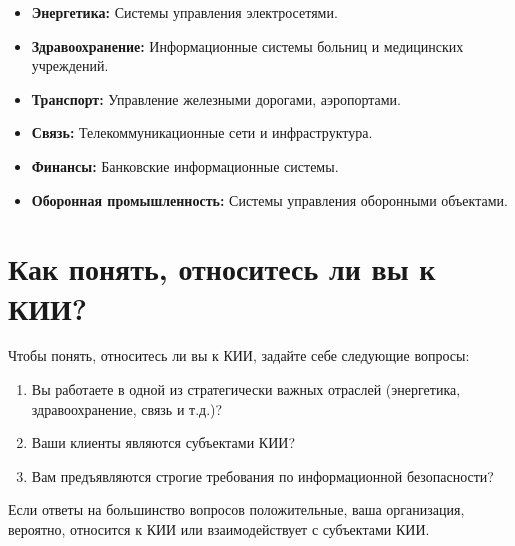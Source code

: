 \documentclass[a4paper, 14pt]{report}
\begin{document}
\begin{itemize}
    \item \textbf{Энергетика:} Системы управления электросетями.
    \item \textbf{Здравоохранение:} Информационные системы больниц и медицинских учреждений.
    \item \textbf{Транспорт:} Управление железными дорогами, аэропортами.
    \item \textbf{Связь:} Телекоммуникационные сети и инфраструктура.
    \item \textbf{Финансы:} Банковские информационные системы.
    \item \textbf{Оборонная промышленность:} Системы управления оборонными объектами.
\end{itemize}

\section{Как понять, относитесь ли вы к КИИ?}
Чтобы понять, относитесь ли вы к КИИ, задайте себе следующие вопросы:
\begin{enumerate}
    \item Вы работаете в одной из стратегически важных отраслей (энергетика, здравоохранение, связь и т.д.)?
    \item Ваши клиенты являются субъектами КИИ?
    \item Вам предъявляются строгие требования по информационной безопасности?
\end{enumerate}

Если ответы на большинство вопросов положительные, ваша организация, вероятно, относится к КИИ или взаимодействует с субъектами КИИ\cite{habr_kii}.
\end{document}
